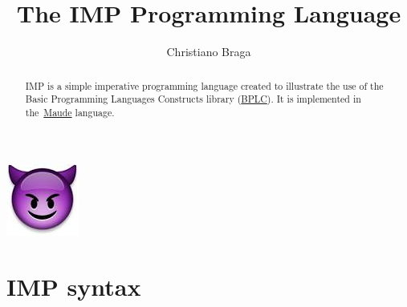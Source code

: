 \documentclass{llncs}%
\begin{document}
\title{The IMP Programming Language}
\author{Christiano Braga\\}

\maketitle

\begin{center} \includegraphics[scale=0.45]{img/imp.jpg}\end{center}

\begin{abstract}
IMP is a simple imperative programming language created to illustrate the use
of the Basic Programming Languages Constructs library
(\href{http://github.com/ChristianoBraga/BPLC}{BPLC}). It is implemented in
the~\href{http://maude.cs.uiuc.edu}{Maude} language.
\end{abstract}

\pagestyle{plain}

\section{IMP syntax}\label{sec:imp-grammar}
\end{document}
